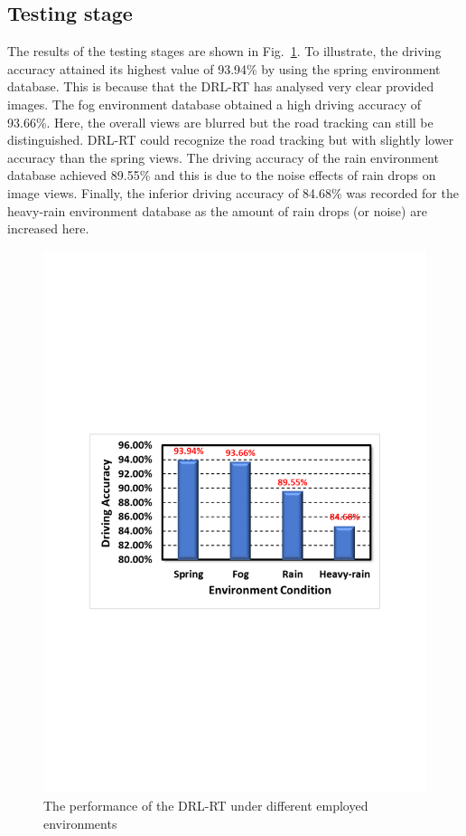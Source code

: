 \documentclass{svproc}
\begin{document}
\subsection{Testing stage} 
The results of the testing stages are %
shown in Fig.~\ref{fig:Main_Results}. To illustrate, the driving accuracy attained its highest value of 93.94\% by using the spring environment database. This is because that the DRL-RT has analysed very clear provided images.  The fog environment database obtained a high driving accuracy of 93.66\%. Here, the overall views are blurred but the road tracking can still be distinguished. DRL-RT could recognize the road tracking but with slightly lower accuracy than the spring views. The driving accuracy of the rain environment database achieved 89.55\% and this is due to the noise effects of rain drops on image views. Finally, the inferior driving accuracy of 84.68\% was recorded for the heavy-rain environment database as the amount of rain drops (or noise) are increased here.
\begin{figure}[!t]
	\centering
	\includegraphics[scale=.58,trim=3cm 10.3cm 2.7cm 10.3cm,clip]{Main_Results.pdf}
	\caption{The performance of the DRL-RT under different employed environments}
	\label{fig:Main_Results}
\end{figure}
\end{document}
